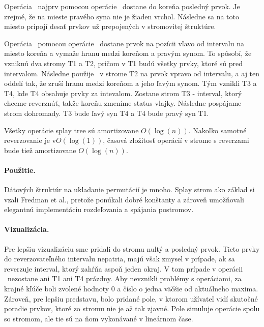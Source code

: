 Operácia \insert\ najprv pomocou operácie \find\ dostane do koreňa posledný prvok. Je zrejmé, že na mieste pravého syna nie je žiaden vrchol. Následne sa na toto miesto pripojí desať prvkov už prepojených v stromovitej štruktúre.

Operácia \reverse\ pomocou operácie \find\ dostane prvok na pozícii vľavo od intervalu na miesto koreňa a vymaže hranu medzi koreňom a pravým synom. To spôsobí, že vzniknú dva stromy T1 a T2, pričom v T1 budú všetky prvky, ktoré sú pred intervalom. Následne použije \find\ v strome T2 na prvok vpravo od intervalu, a aj ten oddelí tak, že zruší hranu medzi koreňom a jeho ľavým synom. Tým vznikli T3 a T4, kde T4 obsahuje prvky za intevalom. Zostane strom T3 - interval, ktorý chceme reverznúť, takže koreňu zmeníme status vlajky. Následne pospájame strom dohromady. T3 bude ľavý syn T4 a T4 bude pravý syn T1.

Všetky operácie splay tree sú amortizovane $O(\log(n))$. Nakoľko samotné reverzovanie je v$O(\log(1))$, časová zložitosť operácií v strome s reverzami bude tiež amortizovane $O(\log(n))$.

\paragraph{Použitie.}
Dátových štruktúr na ukladanie permutácií je mnoho. Splay strom ako základ si vzali Fredman et al., pretože ponúkali dobré konštanty a zároveň umožňovali elegantnú implementáciu rozdeľovania a spájania postromov\citet{reversals}.

\paragraph{Vizualizácia.}
Pre lepšiu vizualizáciu sme pridali do stromu nultý a posledný prvok. Tieto prvky do reverzovateľného intervalu nepatria, majú však zmysel v prípade, ak sa reverzuje interval, ktorý zahŕňa aspoň jeden okraj. V tom prípade v operácii \reverse\ nezostane ani T1 ani T4 prázdny. Aby nevznikli problémy s operáciami, za krajné kľúče boli zvolené hodnoty $0$ a číslo o jedna väčšie od aktuálneho maxima. Zároveň, pre lepšiu predstavu, bolo pridané pole, v ktorom užívateľ vidí skutočné poradie prvkov, ktoré zo stromu nie je až tak zjavné. Pole simuluje operácie spolu so stromom, ale tie sú na ňom vykonávané v lineárnom čase.